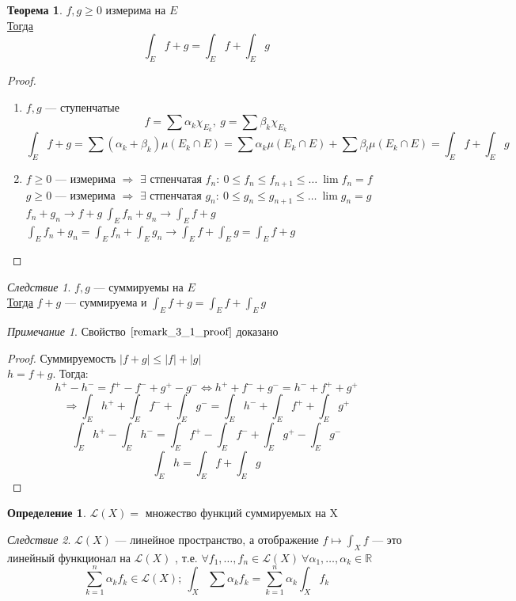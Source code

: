 \documentclass[oneside]{book}
\newcommand{\R}{\mathbb{R}}
\theoremstyle{plain}
\theoremstyle{remark}
\newtheorem*{remark}{Примечание}
\newtheorem{corollary}{Следствие}[theorem]
\theoremstyle{definition}
\newtheorem{theorem}{Теорема}[section]
\newtheorem*{definition}{Определение}
\begin{document}
\begin{theorem}
\(f, g \ge 0\) измерима на \(E\) \\
\uline{Тогда} \[ \int_E f + g = \int_E f + \int_E g \]
\end{theorem}
\begin{proof}
\-
\begin{enumerate}
\item \(f, g\) --- ступенчатые \\
\[ f = \sum \alpha_k\chi_{E_k},\ g = \sum \beta_k\chi_{E_k} \]
\[ \int_E f + g = \sum (\alpha_k + \beta_k)\mu(E_k \cap E) = \sum \alpha_k \mu(E_k \cap E) + \sum \beta_l \mu(E_k \cap E) = \int_E f + \int_E g \]
\item \(f \ge 0\) --- измерима \(\Rightarrow\) \(\exists\) стпенчатая \(f_n:\ 0 \le f_n \le f_{n + 1} \le \dots \ \lim f_n = f\) \\
\(g \ge 0\) --- измерима \(\Rightarrow\) \(\exists\) стпенчатая \(g_n:\ 0 \le g_n \le g_{n + 1} \le \dots \ \lim g_n = g\) \\
\(f_n + g_n \to f + g\ \int_E f_n + g_n \to \int_E f + g\) \\
\(\int_E f_n + g_n = \int_E f_n + \int_E g_n \to \int_E f + \int_E g = \int_E f+g\)
\end{enumerate}
\end{proof}
\begin{corollary}
\(f, g\) --- суммируемы на \(E\) \\
\uline{Тогда} \(f+g\) --- суммируема и \(\int_E f + g = \int_E f + \int_E g\)
\end{corollary}
\begin{remark}
Свойство \(\ref{remark_3_1_proof}\) доказано
\end{remark}
\begin{proof}
Суммируемость \(|f+g|\le |f| + |g|\) \\
\(h = f + g\). Тогда:
\[ h^+ - h^- = f^+ - f^- + g^+ - g^- \Leftrightarrow h^+ + f^- + g^- = h^- + f^+ + g^+ \]
\[ \Rightarrow \int_E h^+ + \int_E f^- + \int_E g^- = \int_E h^- + \int_E f^+ + \int_E g^+ \]
\[ \int_E h^+ - \int_E h^- = \int_E f^+ - \int_E f^- + \int_E g^+ - \int_E g^- \]
\[ \int_E h = \int_E f + \int_E g \]
\end{proof}
\begin{definition}
\(\mathcal{L}(X) =\) множество функций суммируемых на X
\end{definition}
\begin{corollary}
\(\mathcal{L}(X)\) --- линейное пространство, а отображение \(f \mapsto \int_X f\) --- это линейный функционал на \(\mathcal{L}(X)\)
, т.е. \(\forall f_1, \dots, f_n \in \mathcal{L}(X)\ \forall \alpha_1, \dots, \alpha_k \in \R\)
\[ \sum_{k = 1}^n \alpha_k f_k \in \mathcal{L}(X);\ \int_X\sum\alpha_k f_k = \sum_{k = 1}^n\alpha_k\int_X f_k\]
\end{corollary}
\end{document}
